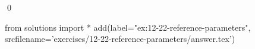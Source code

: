 
\begin{ex}
  \label{ex:12-22-reference-parameters}
  
  \qed
\end{ex}
\begin{python0}
from solutions import *
add(label="ex:12-22-reference-parameters",
    srcfilename='exercises/12-22-reference-parameters/answer.tex')
\end{python0}
